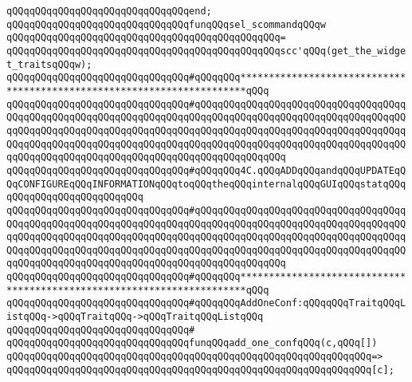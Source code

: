 \verb|qQQqqQQqqQQqqQQqqQQqqQQqqQQqqQQqend;|\newline
\newline
\verb|qQQqqQQqqQQqqQQqqQQqqQQqqQQqqQQqfunqQQqsel_scommandqQQqw|\newline
\verb|qQQqqQQqqQQqqQQqqQQqqQQqqQQqqQQqqQQqqQQqqQQqqQQq=|\newline
\verb|qQQqqQQqqQQqqQQqqQQqqQQqqQQqqQQqqQQqqQQqqQQqqQQqscc'qQQq(get_the_widget_traitsqQQqw);|\newline
\newline
\newline
\verb|qQQqqQQqqQQqqQQqqQQqqQQqqQQqqQQq#qQQqqQQq***********************************************************************qQQq|\newline
\verb|qQQqqQQqqQQqqQQqqQQqqQQqqQQqqQQq#qQQqqQQqqQQqqQQqqQQqqQQqqQQqqQQqqQQqqQQqqQQqqQQqqQQqqQQqqQQqqQQqqQQqqQQqqQQqqQQqqQQqqQQqqQQqqQQqqQQqqQQqqQQqqQQqqQQqqQQqqQQqqQQqqQQqqQQqqQQqqQQqqQQqqQQqqQQqqQQqqQQqqQQqqQQqqQQqqQQqqQQqqQQqqQQqqQQqqQQqqQQqqQQqqQQqqQQqqQQqqQQqqQQqqQQqqQQqqQQqqQQqqQQqqQQqqQQqqQQqqQQqqQQqqQQqqQQqqQQqqQQqqQQqqQQqqQQq|\newline
\verb|qQQqqQQqqQQqqQQqqQQqqQQqqQQqqQQq#qQQqqQQq4C.qQQqADDqQQqandqQQqUPDATEqQQqCONFIGUREqQQqINFORMATIONqQQqtoqQQqtheqQQqinternalqQQqGUIqQQqstatqQQqqQQqqQQqqQQqqQQqqQQqqQQq|\newline
\verb|qQQqqQQqqQQqqQQqqQQqqQQqqQQqqQQq#qQQqqQQqqQQqqQQqqQQqqQQqqQQqqQQqqQQqqQQqqQQqqQQqqQQqqQQqqQQqqQQqqQQqqQQqqQQqqQQqqQQqqQQqqQQqqQQqqQQqqQQqqQQqqQQqqQQqqQQqqQQqqQQqqQQqqQQqqQQqqQQqqQQqqQQqqQQqqQQqqQQqqQQqqQQqqQQqqQQqqQQqqQQqqQQqqQQqqQQqqQQqqQQqqQQqqQQqqQQqqQQqqQQqqQQqqQQqqQQqqQQqqQQqqQQqqQQqqQQqqQQqqQQqqQQqqQQqqQQqqQQqqQQqqQQqqQQq|\newline
\verb|qQQqqQQqqQQqqQQqqQQqqQQqqQQqqQQq#qQQqqQQq***********************************************************************qQQq|\newline
\newline
\verb|qQQqqQQqqQQqqQQqqQQqqQQqqQQqqQQq#qQQqqQQqAddOneConf:qQQqqQQqTraitqQQqListqQQq->qQQqTraitqQQq->qQQqTraitqQQqListqQQq|\newline
\verb|qQQqqQQqqQQqqQQqqQQqqQQqqQQqqQQq#|\newline
\verb|qQQqqQQqqQQqqQQqqQQqqQQqqQQqqQQqfunqQQqadd_one_confqQQq(c,qQQq[])|\newline
\verb|qQQqqQQqqQQqqQQqqQQqqQQqqQQqqQQqqQQqqQQqqQQqqQQqqQQqqQQqqQQqqQQq=>|\newline
\verb|qQQqqQQqqQQqqQQqqQQqqQQqqQQqqQQqqQQqqQQqqQQqqQQqqQQqqQQqqQQqqQQq[c];|\newline
